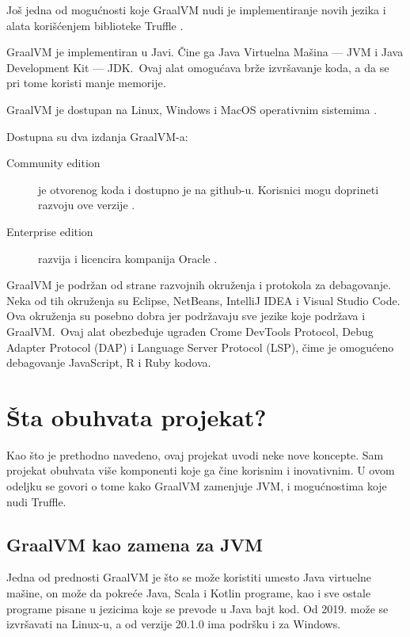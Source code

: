 \documentclass[a4paper]{article}
\begin{document}
Još jedna od mogućnosti koje GraalVM nudi je implementiranje novih jezika i alata korišćenjem biblioteke Truffle \cite{graalvm}.

GraalVM je implementiran u Javi. Čine ga Java Virtuelna Mašina --- JVM i Java Development Kit --- JDK.\ Ovaj alat omogućava brže izvršavanje koda, a da se pri tome koristi manje memorije.

GraalVM je dostupan na Linux, Windows i MacOS operativnim sistemima \cite{graalvm}.

Dostupna su dva izdanja GraalVM-a:

\begin{description}
	\item [Community edition] je otvorenog koda i dostupno je na github-u. Korisnici mogu doprineti razvoju ove verzije \cite{graalvmCommunity}.
	\item [Enterprise edition] razvija i licencira kompanija Oracle \cite{graalvmEnterprise}.
\end{description}

GraalVM je podržan od strane razvojnih okruženja i protokola za debagovanje. Neka od tih okruženja su Eclipse, NetBeans, IntelliJ IDEA i Visual Studio Code. Ova okruženja su posebno dobra jer podržavaju sve jezike koje podržava i GraalVM.\ Ovaj alat obezbeđuje ugrađen Crome DevTools Protocol, Debug Adapter Protocol (DAP) i Language Server Protocol (LSP), čime je omogućeno debagovanje JavaScript, R i Ruby kodova.

\section{Šta obuhvata projekat?}
\label{sec:projekat}

Kao što je prethodno navedeno, ovaj projekat uvodi neke nove koncepte. Sam projekat obuhvata više komponenti koje ga čine korisnim i inovativnim. U ovom odeljku se govori o tome kako GraalVM zamenjuje JVM, i mogućnostima koje nudi Truffle.

\subsection{GraalVM kao zamena za JVM}
\label{sub:GraalVMJVM}

Jedna od prednosti GraalVM je što se može koristiti umesto Java virtuelne mašine, on može da pokreće Java, Scala i Kotlin programe, kao i sve ostale programe pisane u jezicima koje se prevode u Java bajt kod. Od 2019. može se izvršavati na Linux-u, a od verzije 20.1.0 ima podršku i za Windows.
\end{document}
